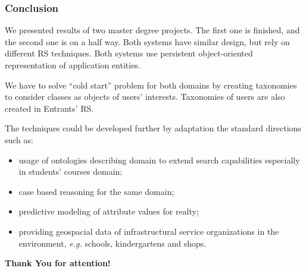 \documentclass[10pt,dvipsnames]{beamer}
\begin{document}
\begin{frame}
  \frametitle{Conclusion}
  We presented results of two master degree projects.  The first one is finished, and the second one is on a half way.  Both systems have similar design, but rely on different RS techniques. Both systems use persistent object-oriented representation of application entities.

We have to solve ``cold start'' problem for both domains by creating taxonomies to consider classes as objects of users' interests.  Taxonomies of users are also created in Entrants' RS.

The techniques could be developed further by adaptation the standard directions such as:
\begin{itemize}
  \item usage of ontologies describing domain to extend search capabilities especially in students' courses domain;
  \item case based reasoning for the same domain;
  \item predictive modeling of attribute values for realty;
  \item providing geospacial data of infrastructural service organizations in the environment, \emph{e.g.} schools, kindergartens and shops.
\end{itemize}
\end{frame}

\begin{frame}{}
  \vfill
  \centering
  \Huge \textbf{Thank You for attention!}
  \vfill
\end{frame}
\end{document}
